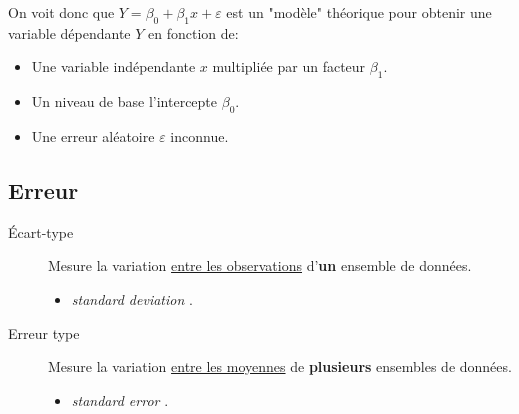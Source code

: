 \documentclass[10pt, french]{article}
\begin{document}
\begin{multicols*}{2}
\begin{tikzpicture}[x=0.75pt,y=0.75pt,yscale=-1,xscale=1]
\end{tikzpicture}

On voit donc que $Y = \beta_{0} + \beta_{1} x + \varepsilon$ est un "modèle" théorique pour obtenir une variable dépendante $Y$ en fonction de: 
\begin{itemize}
	\item	Une variable indépendante $x$ multipliée par un facteur $\beta_{1}$.
	\item	Un niveau de base l'intercepte $\beta_{0}$.
	\item	Une erreur aléatoire $\varepsilon$ inconnue.
\end{itemize}

\end{multicols*}

\subsection*{Erreur}

\begin{description}
	\item[Écart-type]	Mesure la variation \underline{entre les observations} d'\textbf{un} ensemble de données.
		\begin{itemize}[leftmargin = *]
		\item	\og \textit{standard deviation} \fg{}.
		\end{itemize}
	\item[Erreur type]	Mesure la variation \underline{entre les moyennes} de \textbf{plusieurs} ensembles de données.
		\begin{itemize}[leftmargin = *]
		\item	\og \textit{standard error} \fg{}.
		\end{itemize}
\end{description}
\end{document}

